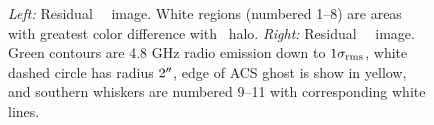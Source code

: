 \begin{figure}
\begin{center}
\begin{minipage}{0.495\linewidth}
    \end{minipage}
    \caption{{\it{Left:}} Residual \hst\ \myv\ image. White regions
      (numbered 1--8) are areas with greatest color difference with
      \rbs\ halo. {\it{Right:}} Residual \hst\ \myi\ image. Green
      contours are 4.8 GHz radio emission down to
      $1\sigma_{\rm{rms}}$, white dashed circle has radius $2\rm{^\prime}\hskip -0.1em\rm{^\prime}$,
      edge of ACS ghost is show in yellow, and southern whiskers are
      numbered 9--11 with corresponding white lines.}
    \label{fig:subopt}
  \end{center}
\end{figure}
